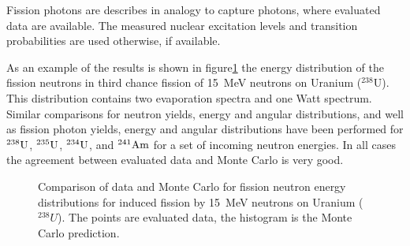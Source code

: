 Fission photons are describes in analogy to capture photons, where evaluated
data are available. The measured nuclear excitation levels and transition
probabilities are used otherwise, if available.

As an example of the results is shown in figure\ref{fission} the energy
distribution of the fission neutrons in third chance fission
of 15~MeV neutrons on Uranium ($^{238}$U). This distribution contains two
evaporation spectra and one Watt spectrum.
Similar comparisons for neutron yields, energy and angular distributions, and
well as fission photon yields, energy and angular distributions have
been performed for
${\rm^{238}U}$, 
${\rm^{235}U}$, 
${\rm^{234}U}$, and 
${\rm^{241}Am}$
for a set of incoming neutron energies.
In all cases the agreement between evaluated data and Monte Carlo is very good.

\begin{figure}[b!] %
\centerline{}
\vspace{10pt}
\caption{Comparison of data and Monte Carlo for fission neutron energy
distributions for induced fission by 15~MeV neutrons on Uranium ($^{238}U$). 
The points are evaluated data, the histogram is
the Monte Carlo prediction.}
\label{fission}
\end{figure}



